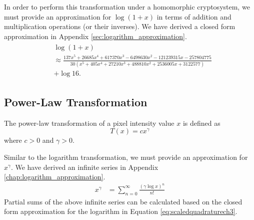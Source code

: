 In order to perform this transformation under a homomorphic cryptosystem, we must provide an approximation for $\log\left(1 + x\right)$ in terms of addition and multiplication operations (or their inverses). We have derived a closed form approximation in Appendix \ref{sec:logarithm_approximation}.
\begin{align}\label{eq:optimal_log_approximation_ch3}
	\begin{split}
		&\log\left(1+x\right) \\
		&\approx \frac{137x^5 + 26685x^4 + 617370x^3 - 6498630x^2 - 121239315x - 257804775}
		{30(x^5 + 405x^4 + 27210x^3 + 488810x^2 + 2536005x + 3122577)}\\
		&+ \log{16}.
	\end{split}
\end{align}

\subsection{Power-Law Transformation}
The power-law transformation of a pixel intensity value $x$ is defined as
\begin{equation}
    T\left(x\right) = cx^{\gamma}
\end{equation}
where $c>0$ and $\gamma > 0$.

Similar to the logarithm transformation, we must provide an approximation for $x^\gamma$.
We have derived an infinite series in Appendix \ref{chap:logarithm_approximation}.
\begin{align*}
	x^\gamma &= \sum_{n=0}^{\infty}{\frac{(\gamma\log{x})^n}{n!}}
\end{align*}
Partial sums of the above infinite series can be calculated based on the closed form approximation for the logarithm in Equation \ref{eq:scaledquadraturech3}.
